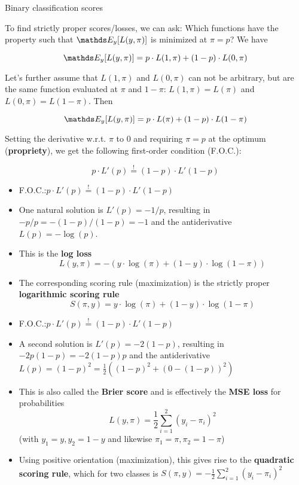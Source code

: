 \documentclass[11pt,compress,t,notes=noshow, xcolor=table]{beamer}
\begin{document}
\begin{vbframe}{Binary classification scores}

To find strictly proper scores/losses, we can ask: Which functions have the property such that $\E_y[L(y,\pi)]$ is minimized at $\pi=p$? We have

$$\E_{y}[L(y,\pi)]=p \cdot L(1,\pi) + (1-p) \cdot L(0,\pi)$$

Let's further %
assume that $L(1,\pi)$ and $L(0, \pi)$ can not be arbitrary, but are the same function evaluated at $\pi$ and $1-\pi$:
$L(1,\pi)=L(\pi)$ and $L(0,\pi)=L(1-\pi)$. Then

$$\E_{y}[L(y,\pi)]=p \cdot L(\pi) + (1-p) \cdot L(1-\pi)$$

\vspace{0.2cm}

Setting the derivative w.r.t. $\pi$ to $0$ and requiring $\pi=p$ at the optimum (\textbf{propriety}), we get the following first-order condition (F.O.C.):

\vspace{0.3cm}

$$p \cdot L'(p) \overset{!}{=} (1-p) \cdot L'(1-p)$$

\framebreak

\begin{itemize}\setlength\itemsep{1.9em}
    \item F.O.C.:\quad $p \cdot L'(p) \overset{!}{=} (1-p) \cdot L'(1-p)$
    \item One natural solution is $L'(p)=-1/p$, resulting in $-p/p=-(1-p)/(1-p)=-1$ and the antiderivative $L(p)=-\log(p)$. 
    \item This is the \textbf{log loss} $$L(y,\pi)=-(y \cdot \log(\pi) + (1-y) \cdot \log(1-\pi))$$
    \item The corresponding scoring rule (maximization) is the strictly proper \textbf{logarithmic scoring rule} $$S(\pi,y)=y \cdot \log(\pi) + (1-y) \cdot \log(1-\pi)$$
\end{itemize}

\framebreak

\begin{itemize} \setlength\itemsep{1.2em}
    \item F.O.C.:\quad $p \cdot L'(p) \overset{!}{=} (1-p) \cdot L'(1-p)$
    \item A second solution is $L'(p)=-2(1-p)$, resulting in $-2p(1-p)=-2(1-p)p$ and the antiderivative $L(p)=(1-p)^2=\frac{1}{2}((1-p)^2+(0-(1-p))^2)$
    \item This is also called the \textbf{Brier score} and is effectively the \textbf{MSE loss} for probabilities $$L(y,\pi)=\frac{1}{2}\sum_{i=1}^{2}(y_i-\pi_i)^2$$
     {\small (with $y_1=y, y_2=1-y$ and likewise $\pi_1=\pi, \pi_2=1-\pi$)}
    \item Using positive orientation (maximization), this gives rise to the \textbf{quadratic scoring rule}, which for two classes is $S(\pi,y)=-\frac{1}{2} \sum_{i=1}^{2}(y_i-\pi_i)^2$
\end{itemize}

\end{vbframe}



\endlecture
\end{document}
